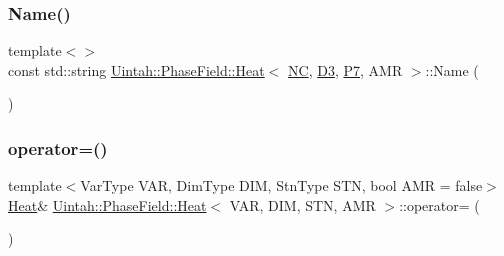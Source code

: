 \mbox{\label{classUintah_1_1PhaseField_1_1Heat_a273e338193aa6830f8d5fe48a8772bf4}} 
\subsubsection{\texorpdfstring{Name()}{Name()}\hspace{0.1cm}{\footnotesize\ttfamily [8/8]}}
{\footnotesize\ttfamily template$<$$>$ \\
const std\+::string \hyperlink{classUintah_1_1PhaseField_1_1Heat}{Uintah\+::\+Phase\+Field\+::\+Heat}$<$ \hyperlink{namespaceUintah_1_1PhaseField_a33d355affda78a83f45755ba8388cedda77924170fe82bfd58b74ca3e44139718}{NC}, \hyperlink{namespaceUintah_1_1PhaseField_a12bfc68444894dffdf0cb8d9cf0cc76aa72fd61934c7ca788c49ad90629f76e78}{D3}, \hyperlink{namespaceUintah_1_1PhaseField_a24d833a720598df1020f5cc2e75f8702a099a5b9a00f5644bb917fdec6afd8768}{P7}, A\+MR $>$\+::Name (\begin{DoxyParamCaption}{ }\end{DoxyParamCaption})}

\mbox{\label{classUintah_1_1PhaseField_1_1Heat_ad93a7ce5e5ad3a18808f63846dd309cd}} 
\subsubsection{\texorpdfstring{operator=()}{operator=()}}
{\footnotesize\ttfamily template$<$Var\+Type V\+AR, Dim\+Type D\+IM, Stn\+Type S\+TN, bool A\+MR = false$>$ \\
\hyperlink{classUintah_1_1PhaseField_1_1Heat}{Heat}\& \hyperlink{classUintah_1_1PhaseField_1_1Heat}{Uintah\+::\+Phase\+Field\+::\+Heat}$<$ V\+AR, D\+IM, S\+TN, A\+MR $>$\+::operator= (\begin{DoxyParamCaption}\item[{\hyperlink{classUintah_1_1PhaseField_1_1Heat}{Heat}$<$ V\+AR, D\+IM, S\+TN, A\+MR $>$ const \&}]{ }\end{DoxyParamCaption})\hspace{0.3cm}{\ttfamily [delete]}}



